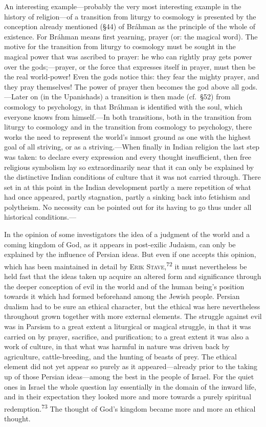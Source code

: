 \documentclass[12pt,a4paper]{book}
\newcommand{\opage}[1]{\marginnote{\footnotesize\textit{[#1]}}}
\begin{document}
An interesting example---probably the very most interesting example in the history of
religion---of a transition from liturgy to cosmology is presented by the conception already
mentioned (§44) of Bráhman as the principle of the whole of existence. For Bráhman means first
yearning, prayer (or: the magical word). The motive for the transition from liturgy to cosmology
must be sought in the magical power that was ascribed to prayer: he who can rightly pray gets
power over the gods;---prayer, or the force that expresses itself in prayer, must then be the
real world-power! Even the gods notice this: they fear the mighty prayer, and they pray
themselves! The power of prayer then becomes the god above all gods.---Later on (in the
Upanishads) a transition is then made (cf.\ §52) from cosmology to psychology, in that Bráhman
is identified with the soul, which everyone knows from himself.---In both transitions, both in
the transition from liturgy to cosmology and in the transition from cosmology to psychology,
there works the need to represent the world's inmost ground as one with the highest goal of all
striving, or as a striving.---When finally in Indian religion the last step was taken: to declare
every expression and every thought insufficient, then free religious symbolism lay so
extraordinarily near that it can only be explained by the distinctive Indian conditions of culture
that it was not carried through. There set in at this point in the Indian development partly a
mere repetition of what had once appeared, partly stagnation, partly a sinking back into fetishism
and polytheism. No necessity can be pointed out for its having to go thus under all historical
conditions.---

In the opinion of some investigators the idea of a judgment of the world and a coming kingdom of
God, as it appears in post-exilic Judaism, can only be explained by the influence of Persian ideas.
But even if one accepts this opinion, which has been maintained in detail by \textsc{Erik
Stave},\textsuperscript{72} it must nevertheless be held fast that the ideas taken up acquire an
altered form and significance through the deeper conception of evil in the world and of the human
being's position towards it which had formed beforehand among the Jewish people. Persian 
\opage{143}dualism had to be sure an ethical character, but the ethical was here nevertheless throughout grown together
with more external elements. The struggle against evil was in Parsism to a great extent a liturgical
or magical struggle, in that it was carried on by prayer, sacrifice, and purification; to a great
extent it was also a work of culture, in that what was harmful in nature was driven back by
agriculture, cattle-breeding, and the hunting of beasts of prey. The ethical element did not yet
appear so purely as it appeared---already prior to the taking up of those Persian ideas---among the
best in the people of Israel. For the quiet ones in Israel the whole question lay essentially in the
domain of the inward life, and in their expectation they looked more and more towards a purely
spiritual redemption.\textsuperscript{73} The thought of God's kingdom became more and more an
ethical thought.
\end{document}
